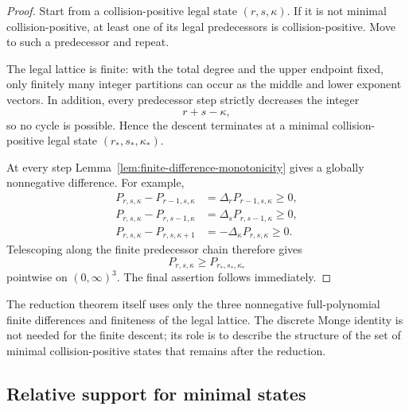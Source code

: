 \documentclass[11pt]{article}
\theoremstyle{definition}
\begin{document}
\begin{proof}
Start from a collision-positive legal state \((r,s,\kappa)\).  If it is not minimal collision-positive, at least one of its legal predecessors is collision-positive.  Move to such a predecessor and repeat.

The legal lattice is finite: with the total degree and the upper endpoint fixed, only finitely many integer partitions can occur as the middle and lower exponent vectors.  In addition, every predecessor step strictly decreases the integer
\begin{equation*}
r+s-\kappa,
\end{equation*}
so no cycle is possible.  Hence the descent terminates at a minimal collision-positive legal state \((r_*,s_*,\kappa_*)\).

At every step Lemma~\ref{lem:finite-difference-monotonicity} gives a globally nonnegative difference.  For example,
\begin{align*}
P_{r,s,\kappa}-P_{r-1,s,\kappa}
&=
\Delta_rP_{r-1,s,\kappa}
\ge0,\\
P_{r,s,\kappa}-P_{r,s-1,\kappa}
&=
\Delta_sP_{r,s-1,\kappa}
\ge0,\\
P_{r,s,\kappa}-P_{r,s,\kappa+1}
&=
-\Delta_\kappa P_{r,s,\kappa}
\ge0.
\end{align*}
Telescoping along the finite predecessor chain therefore gives
\begin{equation*}
P_{r,s,\kappa}
\ge
P_{r_*,s_*,\kappa_*}
\end{equation*}
pointwise on \((0,\infty)^3\).  The final assertion follows immediately.
\end{proof}

The reduction theorem itself uses only the three nonnegative full-polynomial finite differences and finiteness of the legal lattice.  The discrete Monge identity is not needed for the finite descent; its role is to describe the structure of the set of minimal collision-positive states that remains after the reduction.

\subsection{Relative support for minimal states}
\label{sec:relative-support}
\end{document}
